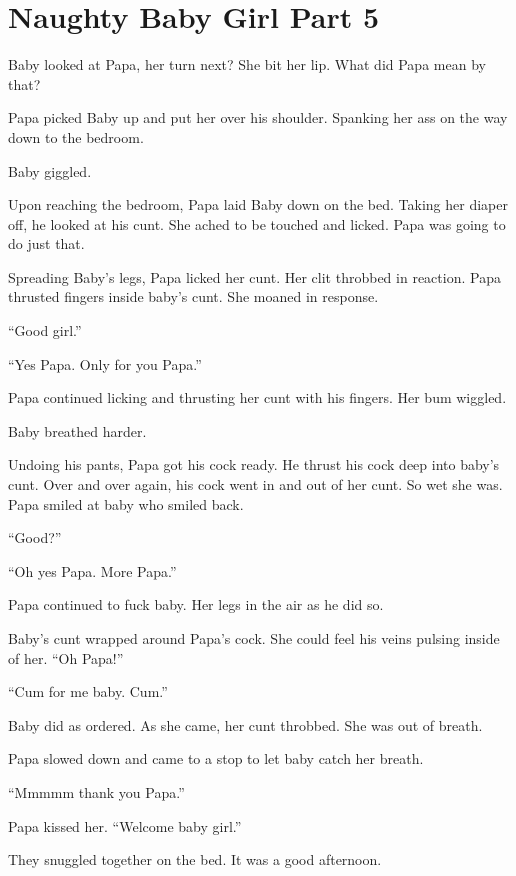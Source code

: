 \section{Naughty Baby Girl Part 5}

     Baby looked at Papa, her turn next? She bit her lip. What did Papa mean by that?

     Papa picked Baby up and put her over his shoulder. Spanking her ass on the way down to the bedroom.

     Baby giggled.

     Upon reaching the bedroom, Papa laid Baby down on the bed. Taking her diaper off, he looked at his cunt. She ached to be touched and licked. Papa was going to do just that.

     Spreading Baby’s legs, Papa licked her cunt. Her clit throbbed in reaction. Papa thrusted fingers inside baby’s cunt. She moaned in response.

     “Good girl.”

     “Yes Papa. Only for you Papa.”

     Papa continued licking and thrusting her cunt with his fingers. Her bum wiggled.

     Baby breathed harder.

     Undoing his pants, Papa got his cock ready. He thrust his cock deep into baby’s cunt. Over and over again, his cock went in and out of her cunt. So wet she was. Papa smiled at baby who smiled back.

     “Good?”

     “Oh yes Papa. More Papa.”

     Papa continued to fuck baby. Her legs in the air as he did so.

     Baby’s cunt wrapped around Papa’s cock. She could feel his veins pulsing inside of her. “Oh Papa!”

     “Cum for me baby. Cum.”

     Baby did as ordered. As she came, her cunt throbbed. She was out of breath.

     Papa slowed down and came to a stop to let baby catch her breath.

     “Mmmmm thank you Papa.”

     Papa kissed her. “Welcome baby girl.”

     They snuggled together on the bed. It was a good afternoon.


